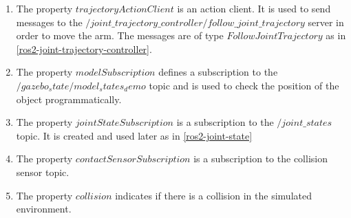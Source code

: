 \documentclass[12pt,oneside]{article}
\begin{document}
\begin{enumerate}
\item\label{env-manager:trajectory-action-client} The property $trajectoryActionClient$ is an action client. It is used to send messages to the $/joint\_trajectory\_controller/follow\_joint\_trajectory$ server in order to move the arm. The messages are of type $FollowJointTrajectory$ as in \ref{ros2-joint-trajectory-controller}.
\item\label{env-manager:model-subscription} The property $modelSubscription$ defines a subscription to the $/gazebo_state/model_states_demo$ topic and is used to check the position of the object programmatically.
\item\label{env-manager:joint-state-subscription} The property $jointStateSubscription$ is a subscription to the $/joint\_states$ topic. It is created and used later as in \ref{ros2-joint-state}
\item The property $contactSensorSubscription$ is a subscription to the collision sensor topic. 
\item The property $collision$ indicates if there is a collision in the simulated environment.
\end{enumerate}
\end{document}
